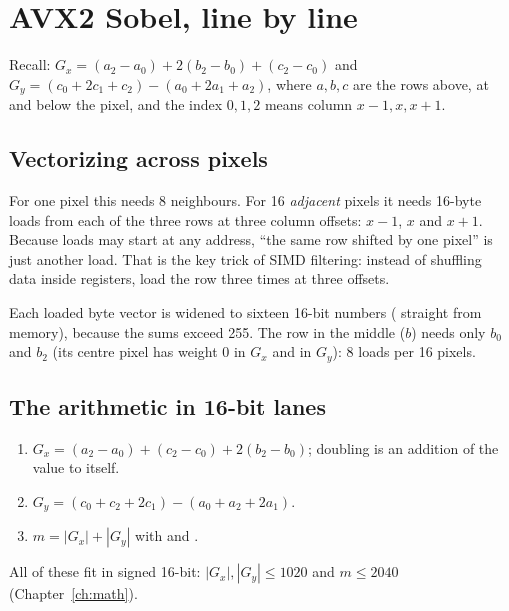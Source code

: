 \chapter{AVX2 Sobel, line by line}\label{ch:sobel}

Recall: $G_x=(a_2-a_0)+2(b_2-b_0)+(c_2-c_0)$ and $G_y=(c_0+2c_1+c_2)-(a_0+2a_1+a_2)$, where $a,b,c$ are the rows above, at and below the pixel, and the index $0,1,2$ means column $x-1,x,x+1$.

\section{Vectorizing across pixels}

For one pixel this needs 8 neighbours. For 16 \emph{adjacent} pixels it needs 16-byte loads from each of the three rows at three column offsets: $x-1$, $x$ and $x+1$. Because loads may start at any address, ``the same row shifted by one pixel'' is just another load. That is the key trick of SIMD filtering: instead of shuffling data inside registers, load the row three times at three offsets.

\begin{center}
\end{center}

Each loaded byte vector is widened to sixteen 16-bit numbers ( straight from memory), because the sums exceed 255. The row in the middle ($b$) needs only $b_0$ and $b_2$ (its centre pixel has weight 0 in $G_x$ and in $G_y$): 8 loads per 16 pixels.

\section{The arithmetic in 16-bit lanes}

\begin{enumerate}
\item $G_x=(a_2-a_0)+(c_2-c_0)+2(b_2-b_0)$; doubling is an addition of the value to itself.
\item $G_y=(c_0+c_2+2c_1)-(a_0+a_2+2a_1)$.
\item $m=|G_x|+|G_y|$ with  and .
\end{enumerate}
All of these fit in signed 16-bit: $|G_x|,|G_y|\le1020$ and $m\le2040$ (Chapter~\ref{ch:math}).

